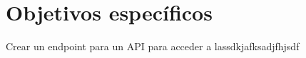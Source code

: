 \section{Objetivos específicos}


\item Crear un endpoint para un API para acceder a lassdkjafksadjfhjsdf
